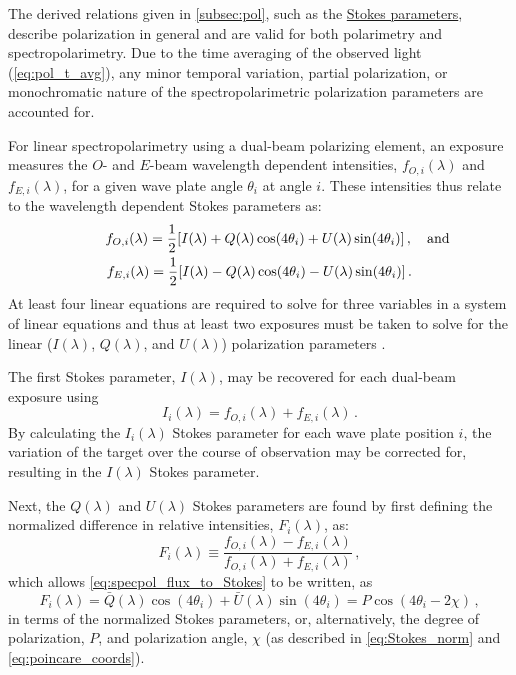 The derived relations given in \autoref{subsec:pol}, such as the \hyperref[eq:Stokes_params]{Stokes parameters}, describe polarization in general and are valid for both polarimetry and spectropolarimetry. Due to the time averaging of the observed light (\autoref{eq:pol_t_avg}), any minor temporal variation, partial polarization, or monochromatic nature of the spectropolarimetric polarization parameters are accounted for.

For linear spectropolarimetry using a dual-beam polarizing element, an exposure measures the $O$- and $E$-beam wavelength dependent intensities, $f_{O, i}(\lambda)$ and $f_{E, i}(\lambda)$, for a given wave plate angle $\theta_{i}$ at angle $i$. These intensities thus relate to the wavelength dependent Stokes parameters as:
\begin{equation}
    \begin{gathered}
        f_{O, i}(\lambda) = \frac{1}{2} [I(\lambda) + Q(\lambda)\cos(4\theta_{i}) + U(\lambda)\sin(4\theta_{i})]\,,\rlap{\quad and} \\
        f_{E, i}(\lambda) = \frac{1}{2} [I(\lambda) - Q(\lambda)\cos(4\theta_{i}) - U(\lambda)\sin(4\theta_{i})]\,.
    \end{gathered}\label{eq:specpol_flux_to_Stokes}
\end{equation}
At least four linear equations are required to solve for three variables in a system of linear equations and thus at least two exposures must be taken to solve for the linear ($I(\lambda)$, $Q(\lambda)$, and $U(\lambda)$) polarization parameters \citep{pol_std, keller_instr}.

The first Stokes parameter, $I(\lambda)$, may be recovered for each dual-beam exposure using
\begin{equation}
    I_{i}(\lambda) = f_{O, i}(\lambda) + f_{E, i}(\lambda)\,.\label{eq:specpol_I_calc}
\end{equation}
By calculating the $I_{i}(\lambda)$ Stokes parameter for each wave plate position $i$, the variation of the target over the course of observation may be corrected for, resulting in the $I(\lambda)$ Stokes parameter.

Next, the $Q(\lambda)$ and $U(\lambda)$ Stokes parameters are found by first defining the normalized difference in relative intensities, $F_{i}(\lambda)$, as:
\begin{equation}
    F_{i}(\lambda) \equiv \frac{f_{O, i}(\lambda) - f_{E, i}(\lambda)}{f_{O, i}(\lambda) + f_{E, i}(\lambda)}\,,\label{eq:specpol_norm_flux}
\end{equation}
which allows \autoref{eq:specpol_flux_to_Stokes} to be written, as
\begin{equation}
    F_{i}(\lambda) = \bar{Q}(\lambda) \cos(4\theta_{i}) + \bar{U}(\lambda) \sin(4\theta_{i}) = P\cos(4\theta_{i} - 2\chi)\,,\label{eq:specpol_F_to_params}
\end{equation}
in terms of the normalized Stokes parameters, or, alternatively, the degree of polarization, $P$, and polarization angle, $\chi$ (as described in \autoref{eq:Stokes_norm} and \ref{eq:poincare_coords}).

